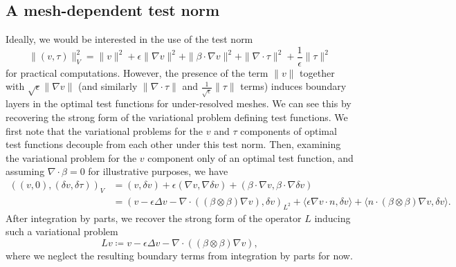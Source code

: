 \documentclass[11pt,onecolumn]{scrartcl}
\newcommand{\seclab}[1]{\label{sec:#1}}
\newcommand{\tanbui}[2]{\textcolor{blue}{\sout{#1}} \textcolor{red}{#2}}
\newcommand{\grad}{\nabla}
\renewcommand{\div}{\grad \cdot}
\begin{document}

\subsection{A mesh-dependent test norm}
\seclab{sec:meshDep}
Ideally, we would be interested in the use of the test norm 
\[
\|\left(v,\tau\right)\|_{V}^2 = \|v\|^2 + \epsilon \|\grad v\|^2 + \|\beta \cdot \grad v\|^2 + \| \div \tau\|^2 + \frac{1}{\epsilon}\|\tau\|^2
\]
for practical computations. However, the presence of the term $\|v\|$ together with $\sqrt{\epsilon}\|\grad v\|$ (and similarly $\|\div \tau\|$ and $\frac{1}{\sqrt{\epsilon}}\|\tau\|$ terms) induces boundary layers in the optimal test functions for under-resolved meshes. We can see this by recovering the strong form of the variational problem defining test functions. We first note that the variational problems for the $v$ and $\tau$ components of optimal test functions decouple from each other under this test norm. Then, examining the variational problem for the $v$ component only of an optimal test function, and assuming $\div \beta = 0$ for illustrative purposes, we have 
\begin{align*}
\left(\left(v,0\right),\left(\delta v,\delta\tau\right)\right)_{V} &= (v,\delta v) + \epsilon \left(\grad v,\grad \delta v\right) + \left(\beta \cdot \grad v, \beta \cdot \grad \delta v\right)\\
&= \left(v - \epsilon \Delta v - \div \left(\left(\beta \otimes \beta\right) \grad v\right), \delta v\right)_{L^2} + \langle \epsilon \grad v\cdot n, \delta v\rangle + \langle n\cdot \left(\beta\otimes\beta\right) \grad v , \delta v\rangle.
\end{align*}
After integration by parts, we recover the strong form of the operator $L$ inducing such a variational problem 
\[
Lv \coloneqq v - \epsilon \Delta v - \div \left(\left(\beta \otimes \beta\right) \grad v\right),
\]
where we neglect the resulting boundary terms from integration by parts for now. 
\end{document}
